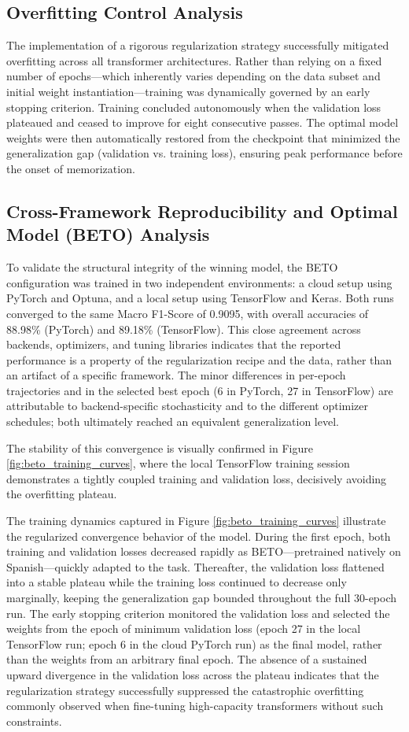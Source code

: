 \documentclass[informatics,article,accept,pdftex,moreauthors]{Definitions/mdpi}
\begin{document}
\subsection{Overfitting Control Analysis}
The implementation of a rigorous regularization strategy successfully mitigated overfitting across all transformer architectures. Rather than relying on a fixed number of epochs—which inherently varies depending on the data subset and initial weight instantiation—training was dynamically governed by an early stopping criterion. Training concluded autonomously when the validation loss plateaued and ceased to improve for eight consecutive passes. The optimal model weights were then automatically restored from the checkpoint that minimized the generalization gap (validation vs. training loss), ensuring peak performance before the onset of memorization. 

\subsection{Cross-Framework Reproducibility and Optimal Model (BETO) Analysis}
To validate the structural integrity of the winning model, the BETO configuration was trained in two independent environments: a cloud setup using PyTorch and Optuna, and a local setup using TensorFlow and Keras. Both runs converged to the same Macro F1-Score of 0.9095, with overall accuracies of 88.98\% (PyTorch) and 89.18\% (TensorFlow). This close agreement across backends, optimizers, and tuning libraries indicates that the reported performance is a property of the regularization recipe and the data, rather than an artifact of a specific framework. The minor differences in per-epoch trajectories and in the selected best epoch (6 in PyTorch, 27 in TensorFlow) are attributable to backend-specific stochasticity and to the different optimizer schedules; both ultimately reached an equivalent generalization level.

The stability of this convergence is visually confirmed in Figure \ref{fig:beto_training_curves}, where the local TensorFlow training session demonstrates a tightly coupled training and validation loss, decisively avoiding the overfitting plateau. 

The training dynamics captured in Figure \ref{fig:beto_training_curves} illustrate the regularized convergence behavior of the model. During the first epoch, both training and validation losses decreased rapidly as BETO—pretrained natively on Spanish—quickly adapted to the task. Thereafter, the validation loss flattened into a stable plateau while the training loss continued to decrease only marginally, keeping the generalization gap bounded throughout the full 30-epoch run. The early stopping criterion monitored the validation loss and selected the weights from the epoch of minimum validation loss (epoch 27 in the local TensorFlow run; epoch 6 in the cloud PyTorch run) as the final model, rather than the weights from an arbitrary final epoch. The absence of a sustained upward divergence in the validation loss across the plateau indicates that the regularization strategy successfully suppressed the catastrophic overfitting commonly observed when fine-tuning high-capacity transformers without such constraints.
\end{document}
